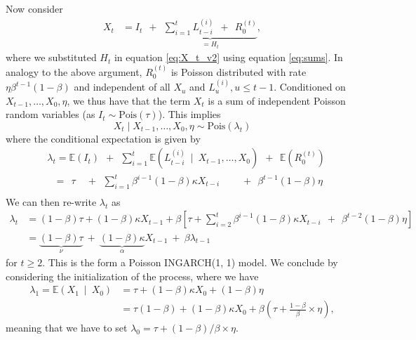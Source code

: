 \documentclass{article}
\begin{document}
Now consider %
\begin{align}
X_t & = I_t \ \ + \ \ \underbrace{\sum_{i = 1}^{t} L_{t - i}^{(i)} \ \ + \ \ R_0^{(t)}}_{= H_t}, \label{eq:introduce_N_T}
\end{align}
where we substituted $H_t$ in equation \eqref{eq:X_t_v2} using equation \eqref{eq:sums}. In analogy to the above argument, $R_0^{(t)}$ is Poisson distributed with rate $\eta\beta^{t - 1}(1 - \beta)$ and independent of all $X_u$ and $L_u^{(i)}, u \leq t - 1$. Conditioned on $X_{t - 1}, \dots, X_0, \eta$, we thus have that the term $X_t$ is a sum of independent Poisson random variables (as $I_t \sim \text{Pois}(\tau)$). This implies
$$
X_t \mid X_{t - 1}, \dots, X_0, \eta \sim \text{Pois}(\lambda_t)
$$
where the conditional expectation is given by
\begin{align*}
& \lambda_t = \mathbb{E}(I_t) \ \ + \ \ \sum_{i = 1}^t \mathbb{E}(L_{t - i}^{(i)} \ \mid \ X_{t- 1}, \dots, X_0) \ \ + \ \ \mathbb{E}(R_0^{(t)})\\
& \ \ \ = \ \ \tau \ \ \ \ \ + \ \ \sum_{i = 1}^t \beta^{i - 1}(1 - \beta)\kappa X_{t - i} \ \ \ \ \ \ \ \ \ \ + \ \ \beta^{t - 1}(1 - \beta)\eta\\
\end{align*}
We can then re-write $\lambda_t$ as
\begin{align*}
\lambda_t & = (1 - \beta)\tau + (1 - \beta)\kappa X_{t - 1} + \beta \left[\tau +    \sum_{i = 2}^t \beta^{i - 1}(1 - \beta)\kappa X_{t - i}  \ \ + \ \ \beta^{t - 2}(1 - \beta)\eta\right]\\
& = \underbrace{(1 - \beta)\tau}_{\nu} \ + \ \underbrace{(1 - \beta)\kappa}_{\alpha} X_{t - 1} \ + \ \beta \lambda_{t - 1}
\end{align*}
for $t \geq 2$. This is the form a Poisson INGARCH(1, 1) model. We conclude by considering the initialization of the process, where we have
\begin{align*}
\lambda_1 = \mathbb{E}(X_1 \ \mid \ X_0) & = \tau + (1 - \beta)\kappa X_0 + (1 - \beta)\eta\\ %
& =  \tau (1 - \beta) + (1 - \beta)\kappa X_0 + \beta  \left(\tau + \frac{1 - \beta}{\beta} \times \eta \right),
\end{align*}
meaning that we have to set $\lambda_0 =\tau + (1 - \beta)/\beta \times \eta$.
\end{document}
